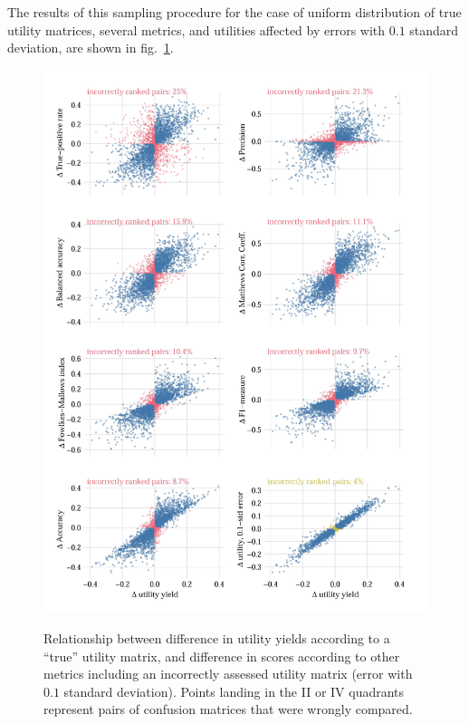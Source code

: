 \documentclass[\ifafour a4paper,12pt,\else a5paper,10pt,\fi%
onecolumn,oneside,article,%
british%
]{memoir}
\theoremstyle{remark}
\theoremstyle{innote}
\renewcommand*{\|}[1][]{\nonscript\:#1\vert\nonscript\:\mathopen{}}
\newcommand*{\fig}{fig.}%
\begin{document}
The results of this sampling procedure for the case of uniform distribution of true utility matrices, several metrics, and utilities affected by errors with $0.1$ standard deviation, are shown in \fig~\ref{fig:wrongly_ranked_pairs}.
\begin{figure}[p]
  \centering
    \includegraphics[width=0.99\linewidth]{incorrectscores4unif-11.jpg}\\
  \caption{Relationship between difference in utility yields according to a \enquote{true} utility matrix, and difference in scores according to other metrics including an incorrectly assessed utility matrix (error with $0.1$ standard deviation). Points landing in the II or IV quadrants represent pairs of confusion matrices that were wrongly compared.}
  \label{fig:wrongly_ranked_pairs}
\end{figure}
\end{document}
